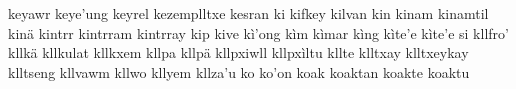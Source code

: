 keyawr\hspace{2mm}
keye'ung\hspace{2mm}
keyrel\hspace{2mm}
kezemplltxe\hspace{2mm}
kesran\hspace{2mm}
ki\hspace{2mm}
kifkey\hspace{2mm}
kilvan\hspace{2mm}
kin\hspace{2mm}
kinam\hspace{2mm}
kinamtil\hspace{2mm}
kinä\hspace{2mm}
kintrr\hspace{2mm}
kintrram\hspace{2mm}
kintrray\hspace{2mm}
kip\hspace{2mm}
kive\hspace{2mm}
kì'ong\hspace{2mm}
kìm\hspace{2mm}
kìmar\hspace{2mm}
kìng\hspace{2mm}
kìte'e\hspace{2mm}
kìte'e si\hspace{2mm}
kllfro'\hspace{2mm}
kllkä\hspace{2mm}
kllkulat\hspace{2mm}
kllkxem\hspace{2mm}
kllpa\hspace{2mm}
kllpä\hspace{2mm}
kllpxiwll\hspace{2mm}
kllpxìltu\hspace{2mm}
kllte\hspace{2mm}
klltxay\hspace{2mm}
klltxeykay\hspace{2mm}
klltseng\hspace{2mm}
kllvawm\hspace{2mm}
kllwo\hspace{2mm}
kllyem\hspace{2mm}
kllza'u\hspace{2mm}
ko\hspace{2mm}
ko'on\hspace{2mm}
koak\hspace{2mm}
koaktan\hspace{2mm}
koakte\hspace{2mm}
koaktu\hspace{2mm}
